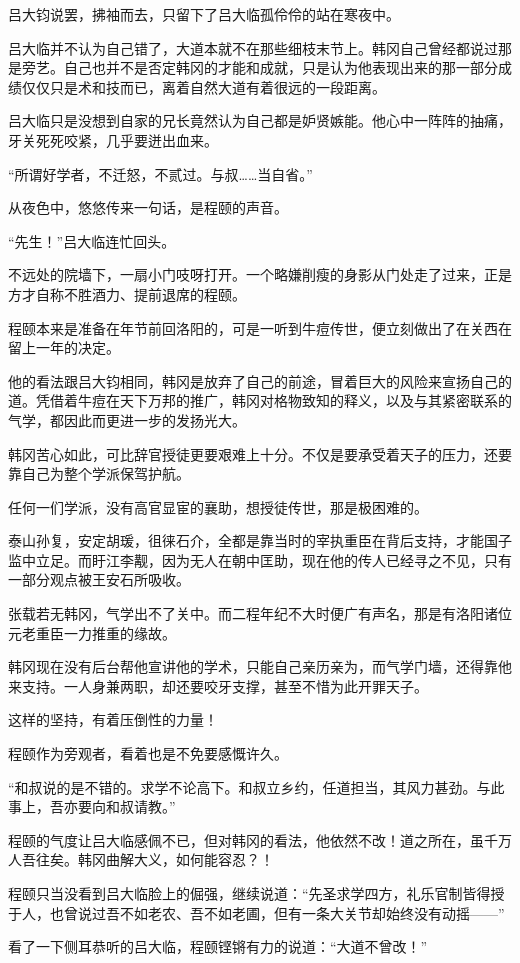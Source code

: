 吕大钧说罢，拂袖而去，只留下了吕大临孤伶伶的站在寒夜中。

吕大临并不认为自己错了，大道本就不在那些细枝末节上。韩冈自己曾经都说过那是旁艺。自己也并不是否定韩冈的才能和成就，只是认为他表现出来的那一部分成绩仅仅只是术和技而已，离着自然大道有着很远的一段距离。

吕大临只是没想到自家的兄长竟然认为自己都是妒贤嫉能。他心中一阵阵的抽痛，牙关死死咬紧，几乎要迸出血来。

“所谓好学者，不迁怒，不贰过。与叔……当自省。”

从夜色中，悠悠传来一句话，是程颐的声音。

“先生！”吕大临连忙回头。

不远处的院墙下，一扇小门吱呀打开。一个略嫌削瘦的身影从门处走了过来，正是方才自称不胜酒力、提前退席的程颐。

程颐本来是准备在年节前回洛阳的，可是一听到牛痘传世，便立刻做出了在关西在留上一年的决定。

他的看法跟吕大钧相同，韩冈是放弃了自己的前途，冒着巨大的风险来宣扬自己的道。凭借着牛痘在天下万邦的推广，韩冈对格物致知的释义，以及与其紧密联系的气学，都因此而更进一步的发扬光大。

韩冈苦心如此，可比辞官授徒更要艰难上十分。不仅是要承受着天子的压力，还要靠自己为整个学派保驾护航。

任何一们学派，没有高官显宦的襄助，想授徒传世，那是极困难的。

泰山孙复，安定胡瑗，徂徕石介，全都是靠当时的宰执重臣在背后支持，才能国子监中立足。而盱江李觏，因为无人在朝中匡助，现在他的传人已经寻之不见，只有一部分观点被王安石所吸收。

张载若无韩冈，气学出不了关中。而二程年纪不大时便广有声名，那是有洛阳诸位元老重臣一力推重的缘故。

韩冈现在没有后台帮他宣讲他的学术，只能自己亲历亲为，而气学门墙，还得靠他来支持。一人身兼两职，却还要咬牙支撑，甚至不惜为此开罪天子。

这样的坚持，有着压倒性的力量！

程颐作为旁观者，看着也是不免要感慨许久。

“和叔说的是不错的。求学不论高下。和叔立乡约，任道担当，其风力甚劲。与此事上，吾亦要向和叔请教。”

程颐的气度让吕大临感佩不已，但对韩冈的看法，他依然不改！道之所在，虽千万人吾往矣。韩冈曲解大义，如何能容忍？！

程颐只当没看到吕大临脸上的倔强，继续说道：“先圣求学四方，礼乐官制皆得授于人，也曾说过吾不如老农、吾不如老圃，但有一条大关节却始终没有动摇——”

看了一下侧耳恭听的吕大临，程颐铿锵有力的说道：“大道不曾改！”

